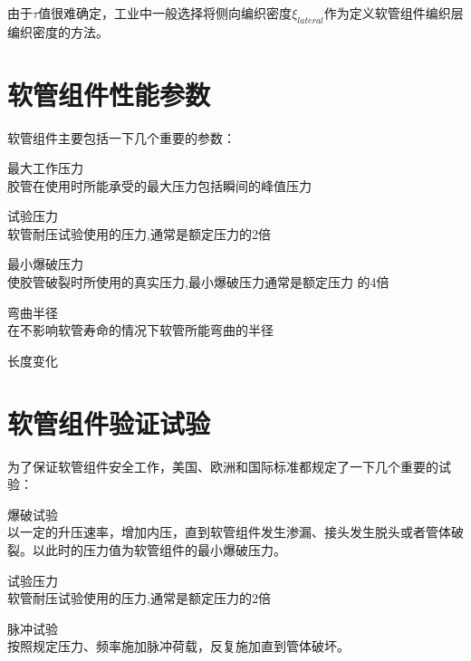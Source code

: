 由于$ \tau $值很难确定，工业中一般选择将侧向编织密度$ \xi_{lateral} $作为定义软管组件编织层编织密度的方法。








\section{软管组件性能参数}

软管组件主要包括一下几个重要的参数：
\begin{compactenum}
	\item 最大工作压力\\
	胶管在使用时所能承受的最大压力包括瞬间的峰值压力
	\item 试验压力\\
	软管耐压试验使用的压力,通常是额定压力的2倍
	\item 最小爆破压力\\
	使胶管破裂时所使用的真实压力,最小爆破压力通常是额定压力 的4倍
	\item 弯曲半径\\
	在不影响软管寿命的情况下软管所能弯曲的半径
	\item 长度变化\\
\end{compactenum}




\section{软管组件验证试验}
为了保证软管组件安全工作，美国、欧洲和国际标准都规定了一下几个重要的试验：
\begin{compactenum}
	\item 爆破试验\\
	以一定的升压速率，增加内压，直到软管组件发生渗漏、接头发生脱头或者管体破裂。以此时的压力值为软管组件的最小爆破压力。
	
	
	\item 试验压力\\
	软管耐压试验使用的压力,通常是额定压力的2倍
	\item 脉冲试验\\
	按照规定压力、频率施加脉冲荷载，反复施加直到管体破坏。
\end{compactenum}	



